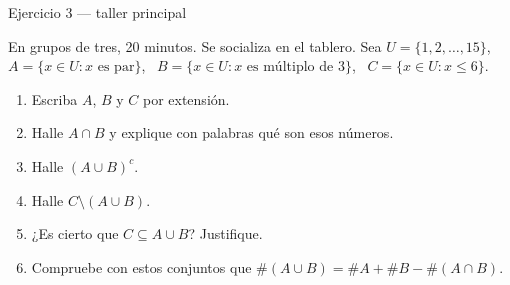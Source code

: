 \documentclass[aspectratio=169,10pt]{beamer}
\begin{document}
\begin{frame}{Ejercicio 3 — taller principal}
  \begin{alertblock}{En grupos de tres, 20 minutos. Se socializa en el tablero.}
    \scriptsize
    Sea $U=\{1,2,\dots,15\}$, \ $A=\{x\in U: x \text{ es par}\}$, \
    $B=\{x\in U: x \text{ es múltiplo de }3\}$, \
    $C=\{x\in U: x \le 6\}$.

    \vspace{0.08cm}
    \begin{enumerate}\setlength{\itemsep}{0.0cm}
      \item Escriba $A$, $B$ y $C$ por extensión.
      \item Halle $A\cap B$ y explique con palabras qué son esos números.
      \item Halle $(A\cup B)^{c}$.
      \item Halle $C\setminus(A\cup B)$.
      \item ¿Es cierto que $C \subseteq A\cup B$? Justifique.
      \item Compruebe con estos conjuntos que
            $\#(A\cup B) = \#A+\#B-\#(A\cap B)$.
    \end{enumerate}
  \end{alertblock}
\end{frame}
\end{document}
